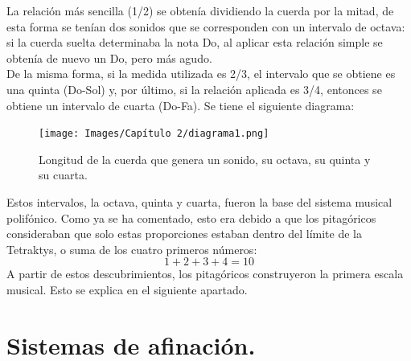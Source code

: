 \documentclass[a4paper, openright, 11pt, titlepage]{report}
\theoremstyle{definition}\newtheorem{defin}[propo]{Definition}
\theoremstyle{definition}\newtheorem{obser}[propo]{Remark}
\theoremstyle{definition}\newtheorem{ejem}[propo]{Ejemplo}
\theoremstyle{definition}\newtheorem{algoritmo}[propo]{Algoritmo}
\begin{document}
La relación más sencilla (1/2) se obtenía dividiendo la cuerda por la mitad, de esta forma se tenían dos sonidos que se corresponden con un intervalo de octava: si la cuerda suelta determinaba la nota Do, al aplicar esta relación simple se obtenía de nuevo un Do, pero más agudo.\\
De la misma forma, si la medida utilizada es 2/3, el intervalo que se obtiene es una quinta (Do-Sol) y, por último, si la relación aplicada es 3/4, entonces se obtiene un intervalo de cuarta (Do-Fa). Se tiene el siguiente diagrama:
\begin{figure}[H]
    \centering
    \texttt{[image: Images/Capítulo 2/diagrama1.png]}
    \caption{Longitud de la cuerda que genera un sonido, su octava, su quinta y su cuarta.}
\end{figure}
Estos intervalos, la octava, quinta y cuarta, fueron la base del sistema musical polifónico. Como ya se ha comentado, esto era debido a que los pitagóricos consideraban que solo estas proporciones estaban dentro del límite de la Tetraktys, o suma de los cuatro primeros números: $$1 + 2 + 3 + 4 = 10$$
A partir de estos descubrimientos, los pitagóricos construyeron la primera escala musical. Esto se explica en el siguiente apartado.
\chapter{Sistemas de afinación.}
\end{document}
